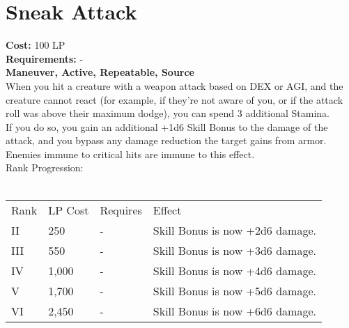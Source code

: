 \section{Sneak Attack}\label{maneuver:sneakAttack}
\textbf{Cost:} 100 LP\\
\textbf{Requirements:} -\\
\textbf{Maneuver, Active, Repeatable, Source}\\
When you hit a creature with a weapon attack based on DEX or AGI, and the creature cannot react (for example, if they're not aware of you, or if the attack roll was above their maximum dodge), you can spend 3 additional Stamina.\\
If you do so, you gain an additional +1d6 Skill Bonus to the damage of the attack, and you bypass any damage reduction the target gains from armor.\\
Enemies immune to critical hits are immune to this effect.
\\
Rank Progression:\\
\\
\begin{tabular}{l | l | l | l}
	Rank & LP Cost & Requires & Effect\\
	II & 250 & - & Skill Bonus is now +2d6 damage.\\
	III & 550 & - &  Skill Bonus is now +3d6 damage.\\
	IV & 1,000 & - &  Skill Bonus is now +4d6 damage.\\
	V & 1,700 & - &  Skill Bonus is now +5d6 damage.\\
	VI & 2,450 & - &  Skill Bonus is now +6d6 damage.\\
\end{tabular}